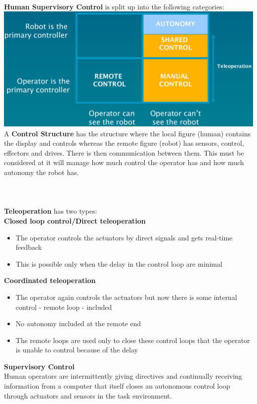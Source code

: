 \documentclass{article}
\begin{document}
	\\{\bfseries Human Supervisory Control} is split up into the following categories:\\
	\includegraphics[scale=0.41]{human_supervisory_control}\\
	A {\bfseries Control Structure} has the structure where the local figure (human) contains the display and controls whereas the remote figure (robot) has sensors, control, effectors and drives. There is then communication between them. This must be considered at it will manage how much control the operator has and how much autonomy the robot has.\\ \\ \\
	\\{\bfseries Teleoperation} has two types:\\{\bfseries Closed loop control/Direct teleoperation}
	\begin{itemize}
		\item The operator controls the actuators by direct signals and gets real-time feedback
		\item This is possible only when the delay in the control loop are minimal
	\end{itemize}
	{\bfseries Coordinated teleoperation}
	\begin{itemize}
		\item The operator again controls the actuators but now there is some internal control - remote loop - included
		\item No autonomy included at the remote end
		\item The remote loops are used only to close these control loops that the operator is unable to control because of the delay
	\end{itemize}
	{\bfseries Supervisory Control}\\
	Human operators are intermittently giving directives and continually receiving information from a computer that itself closes an autonomous control loop through actuators and sensors in the task environment.\\
\end{document}
